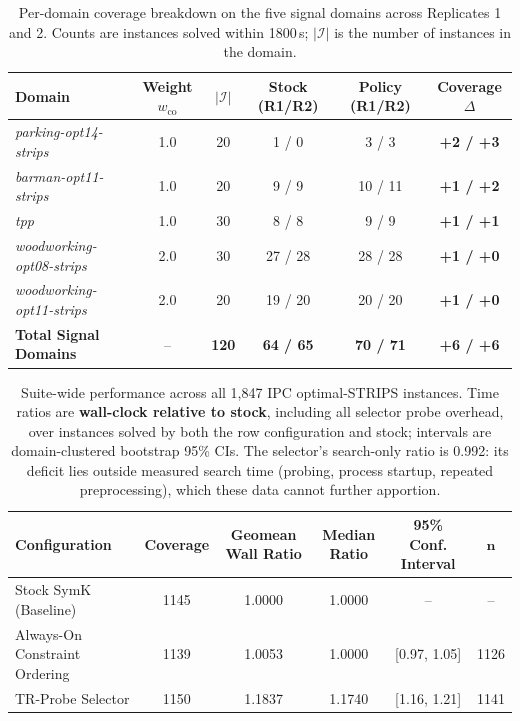 \documentclass[twocolumn,10pt]{article}
\begin{document}
\begin{table}[t]
\centering
\caption{Per-domain coverage breakdown on the five signal domains across Replicates 1 and 2. Counts are instances solved within 1800\,s; $|\mathcal{I}|$ is the number of instances in the domain.}
\label{tab:ab_domain_breakdown}
\small
\begin{tabular}{lccccc}
\toprule
\textbf{Domain} & \textbf{Weight $w_{\text{co}}$} & $\mathbf{|\mathcal{I}|}$ & \textbf{Stock (R1/R2)} & \textbf{Policy (R1/R2)} & \textbf{Coverage $\Delta$} \\
\midrule
\textit{parking-opt14-strips} & 1.0 & 20 & 1 / 0 & 3 / 3 & \textbf{+2 / +3} \\
\textit{barman-opt11-strips} & 1.0 & 20 & 9 / 9 & 10 / 11 & \textbf{+1 / +2} \\
\textit{tpp} & 1.0 & 30 & 8 / 8 & 9 / 9 & \textbf{+1 / +1} \\
\textit{woodworking-opt08-strips} & 2.0 & 30 & 27 / 28 & 28 / 28 & \textbf{+1 / +0} \\
\textit{woodworking-opt11-strips} & 2.0 & 20 & 19 / 20 & 20 / 20 & \textbf{+1 / +0} \\
\midrule
\textbf{Total Signal Domains} & -- & \textbf{120} & \textbf{64 / 65} & \textbf{70 / 71} & \textbf{+6 / +6} \\
\bottomrule
\end{tabular}

\end{table}

\begin{table}[t]
\centering
\caption{Suite-wide performance across all 1,847 IPC optimal-STRIPS instances. Time ratios are \textbf{wall-clock relative to stock}, including all selector probe overhead, over instances solved by both the row configuration and stock; intervals are domain-clustered bootstrap 95\% CIs. The selector's search-only ratio is 0.992: its deficit lies outside measured search time (probing, process startup, repeated preprocessing), which these data cannot further apportion.}
\label{tab:suitewide_results}
\small
\begin{tabular}{lccccc}
\toprule
\textbf{Configuration} & \textbf{Coverage} & \textbf{Geomean Wall Ratio} & \textbf{Median Ratio} & \textbf{95\% Conf. Interval} & $\mathbf{n}$ \\
\midrule
Stock \textsf{SymK} (Baseline) & 1145 & 1.0000 & 1.0000 & -- & -- \\
Always-On Constraint Ordering & 1139 & 1.0053 & 1.0000 & [0.97, 1.05] & 1126 \\
TR-Probe Selector & 1150 & 1.1837 & 1.1740 & [1.16, 1.21] & 1141 \\
\bottomrule
\end{tabular}
\end{table}
\end{document}
